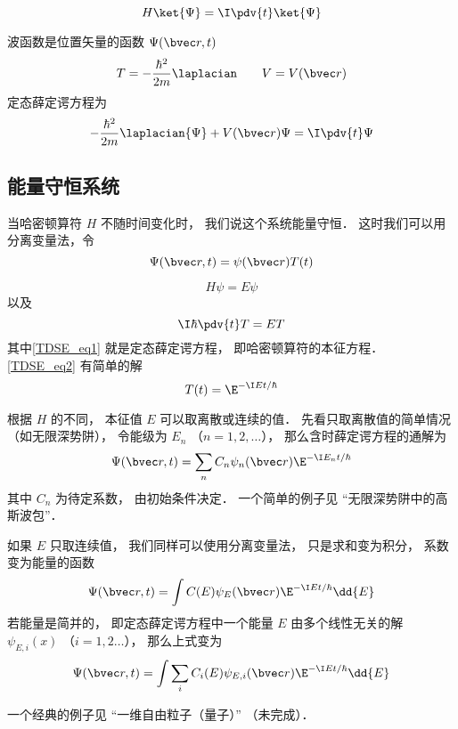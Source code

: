 
\begin{issues}
\issueDraft
\issueAbstract
\end{issues}


\begin{equation}
H \ket{\Psi} = \I \pdv{t} \ket{\Psi}
\end{equation}


波函数是位置矢量的函数 $\Psi(\bvec r, t)$
\begin{equation}
T = -\frac{\hbar^2}{2m} \laplacian \qquad V = V(\bvec r)
\end{equation}
定态薛定谔方程为
\begin{equation}
-\frac{\hbar^2}{2m} \laplacian {\Psi} + V(\bvec r)\Psi = \I \pdv{t} \Psi
\end{equation}

\subsection{能量守恒系统}
当哈密顿算符 $H$ 不随时间变化时， 我们说这个系统能量守恒． 这时我们可以用分离变量法，令
\begin{equation}
\Psi(\bvec r, t) = \psi(\bvec r) T(t)
\end{equation}
 
\begin{equation}\label{TDSE_eq1}
H\psi = E\psi
\end{equation}
以及
\begin{equation}\label{TDSE_eq2}
\I \hbar\pdv{t}T = ET
\end{equation}
其中\autoref{TDSE_eq1} 就是定态薛定谔方程， 即哈密顿算符的本征方程． \autoref{TDSE_eq2} 有简单的解
\begin{equation}
T(t) = \E^{-\I E t/\hbar}
\end{equation}

根据 $H$ 的不同， 本征值 $E$ 可以取离散或连续的值． 先看只取离散值的简单情况（如无限深势阱）， 令能级为 $E_n$ （$n = 1, 2, \dots$）， 那么含时薛定谔方程的通解为
\begin{equation}
\Psi(\bvec r, t) = \sum_n C_n \psi_n(\bvec r) \E^{-\I E_n t/\hbar}
\end{equation}
其中 $C_n$ 为待定系数， 由初始条件决定． 一个简单的例子见 “无限深势阱中的高斯波包”．

如果 $E$ 只取连续值， 我们同样可以使用分离变量法， 只是求和变为积分， 系数变为能量的函数
\begin{equation}\label{TDSE_eq3}
\Psi(\bvec r, t) = \int C(E) \psi_E(\bvec r) \E^{-\I E t/\hbar} \dd{E}
\end{equation}
若能量是简并的， 即定态薛定谔方程中一个能量 $E$ 由多个线性无关的解 $\psi_{E,i}(x)$ （$i=1,2\dots$）， 那么上式变为
\begin{equation}
\Psi(\bvec r, t) = \int \sum_i C_i(E) \psi_{E,i}(\bvec r) \E^{-\I E t/\hbar} \dd{E}
\end{equation}

一个经典的例子见 “一维自由粒子（量子）” （未完成）．
